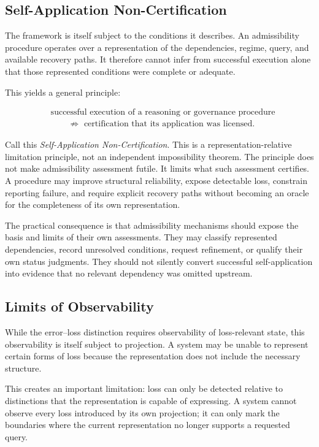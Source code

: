 \documentclass[11pt]{article}
\theoremstyle{definition}
\theoremstyle{remark}
\begin{document}
\subsection{Self-Application Non-Certification}

The framework is itself subject to the conditions it describes. An admissibility procedure operates over a representation of the dependencies, regime, query, and available recovery paths. It therefore cannot infer from successful execution alone that those represented conditions were complete or adequate.

This yields a general principle:

\[
\boxed{
\begin{aligned}
&\text{successful execution of a reasoning or governance procedure}
\\[-0.1em]
&\qquad\not\Rightarrow
\text{ certification that its application was licensed}.
\end{aligned}
}
\]

Call this \emph{Self-Application Non-Certification}. This is a representation-relative limitation principle, not an independent impossibility theorem. The principle does not make admissibility assessment futile. It limits what such assessment certifies. A procedure may improve structural reliability, expose detectable loss, constrain reporting failure, and require explicit recovery paths without becoming an oracle for the completeness of its own representation.

The practical consequence is that admissibility mechanisms should expose the basis and limits of their own assessments. They may classify represented dependencies, record unresolved conditions, request refinement, or qualify their own status judgments. They should not silently convert successful self-application into evidence that no relevant dependency was omitted upstream.

\subsection{Limits of Observability}

While the error--loss distinction requires observability of loss-relevant state, this observability is itself subject to projection. A system may be unable to represent certain forms of loss because the representation does not include the necessary structure.

This creates an important limitation: loss can only be detected relative to distinctions that the representation is capable of expressing. A system cannot observe every loss introduced by its own projection; it can only mark the boundaries where the current representation no longer supports a requested query.
\end{document}
